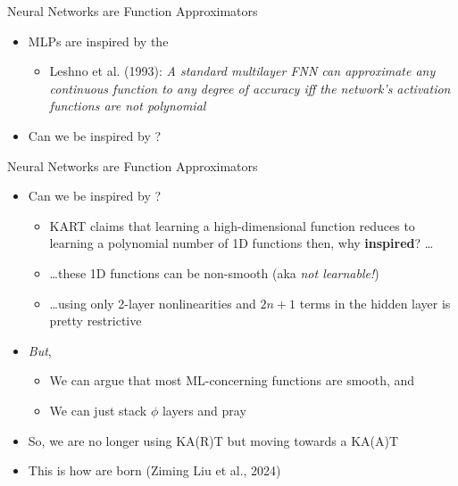
\begin{frame}{Neural Networks are Function Approximators}

\begin{itemize}
    \item MLPs are inspired by the  \vspace{0.5em}
    \begin{itemize}
        \item Leshno et al. (1993):
        \textit{A standard multilayer FNN can approximate any continuous function to any degree of accuracy iff
        the network’s activation functions are not polynomial}
    \end{itemize}
    \vspace{1em}
    \item Can we be inspired by ?
\end{itemize}

\end{frame}

\begin{frame}{Neural Networks are Function Approximators}

\begin{itemize}
    \item Can we be inspired by ?
    \begin{itemize}
        \item KART claims that learning a high-dimensional function reduces to learning a polynomial number of 1D functions then, why \textbf{inspired}? \dots
        \item \dots these 1D functions can be non-smooth (aka \textit{not learnable!})
        \item \dots using only 2-layer nonlinearities and $2n + 1$ terms in the hidden layer is pretty restrictive
    \end{itemize}
    \vspace{1em}
    \item \textit{But},
    \begin{itemize}
        \item We can argue that most ML-concerning functions are smooth, and
        \item We can just stack $\phi$ layers and pray
    \end{itemize}
    \vspace{1em}
    \item So, we are no longer using KA(R)T but moving towards a KA(A)T
    \vspace{1em}
    \item This is how  are born (Ziming Liu et al., 2024)
\end{itemize}

\end{frame}
